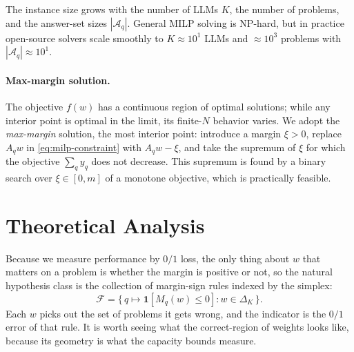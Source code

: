 \documentclass{article} %
\providecommand{\simplex}{\Delta_K}
\providecommand{\Fcal}{\mathcal{F}}
\begin{document}
The instance size grows with the number of LLMs $K$, the number of problems, and
the answer-set sizes $|\mathcal{A}_q|$. General MILP solving is NP-hard, but in
practice open-source solvers scale smoothly to $K \approx 10^1$ LLMs and
$\approx 10^3$ problems with $|\mathcal{A}_q| \approx 10^1$.

\paragraph{Max-margin solution.} The objective $f(w)$ has a continuous region of
optimal solutions; while any interior point is optimal in the limit, its
finite-$N$ behavior varies. We adopt the \emph{max-margin} solution, the most
interior point: introduce a margin $\xi>0$, replace $A_q w$ in
\eqref{eq:milp-constraint} with $A_q w - \xi$, and take the supremum of $\xi$ for
which the objective $\sum_q y_q$ does not decrease. This supremum is found by a
binary search over $\xi \in [0,m]$ of a monotone objective, which is practically
feasible.




\section{Theoretical Analysis}

Because we measure performance by $0/1$ loss, the only thing about $w$ that
matters on a problem is whether the margin is positive or not, so the natural
hypothesis class is the collection of margin-sign rules indexed by the simplex:
\begin{equation}
\label{eq:Fclass}
\Fcal = \big\{\, q\mapsto \mathbf 1[M_q(w)\le 0] : w\in\simplex \,\big\}.
\end{equation}
Each $w$ picks out the set of problems it gets wrong, and the indicator is the
$0/1$ error of that rule. It is worth seeing what the correct-region of weights
looks like, because its geometry is what the capacity bounds measure.
\end{document}
